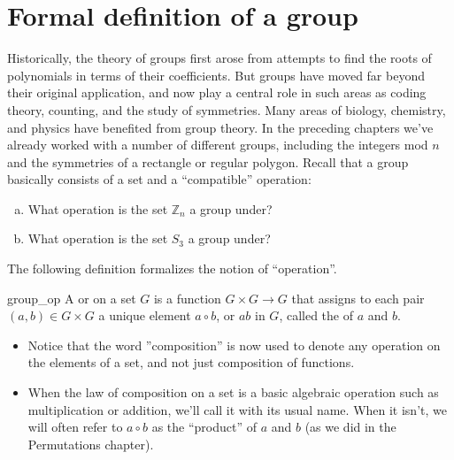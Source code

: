 \section{Formal definition of a group}
\label{sec:Groups:FormalDefinition}

Historically, the theory of groups first arose from attempts to find the roots of polynomials in terms of their coefficients.  But groups have moved far beyond their original application, and now play a central role in such areas as coding theory, counting, and the study of  symmetries. Many areas of biology, chemistry, and physics have benefited from group theory. In the preceding chapters we've already worked with a number of different groups, including the integers mod $n$ and the symmetries of a rectangle or regular polygon. Recall that a group basically consists of a set and a ``compatible'' operation:

\begin{exercise}{}
\begin{enumerate}[(a)]
\item
What operation is the set ${\mathbb Z}_n$ a group under?
\item
What operation is the set $S_3$ a group under?
\end{enumerate}
\end{exercise}
The following definition formalizes the notion of ``operation''.

\begin{defn}{group_op}
 A  or  on a set $G$ is a function $G \times G \rightarrow G$ that assigns to each pair $(a,b) \in G \times G$ a unique element $a \circ b$, or $ab$ in $G$, called the  of $a$ and $b$.
\end{defn}

\begin{rem}
\begin{itemize}
\item
Notice that the word ''composition'' is now used to denote any operation on the elements of a set, and not just composition of functions.
\item
When the law of composition on a set is a basic algebraic operation such as multiplication or addition, we'll call it with its usual name.  When it isn't, we will often refer to $a \circ b$  as the ``product'' of $a$ and $b$  (as we did in the Permutations chapter).
\end{itemize}
\end{rem}

